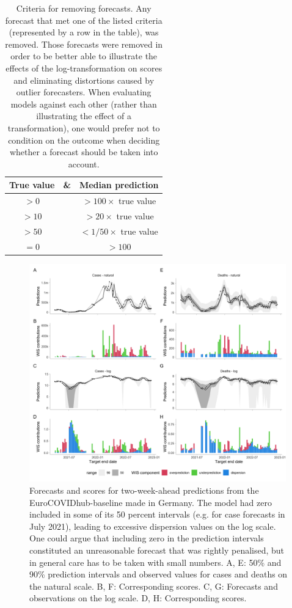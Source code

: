 \documentclass{article}
\begin{document}
\begin{table}
\centering
\begin{tabular}{ccc}
\toprule
True value & \& & Median prediction\\
\midrule
$>0$ & \ & $>100\times$ true value\\
$>10$ & \  & $>20\times$ true value\\
$>50$ & \  & $<1/50\times$ true value\\
$= 0$ & \  & $>100$\\
\bottomrule
\end{tabular}
\caption{Criteria for removing forecasts. Any forecast that met one of the listed criteria (represented by a row in the table), was removed. Those forecasts were removed in order to be better able to illustrate the effects of the log-transformation on scores and eliminating distortions caused by outlier forecasters. When evaluating models against each other (rather than illustrating the effect of a transformation), one would prefer not to condition on the outcome when deciding whether a forecast should be taken into account. }
\label{tab:erroneous}
\end{table}


\begin{figure}[h!]
    \centering
    \includegraphics[width=0.99\textwidth]{output/figures/HUB-model-comparison-baseline.png}
    \caption{
    Forecasts and scores for two-week-ahead predictions from the EuroCOVIDhub-baseline made in Germany. The model had zero included in some of its 50 percent intervals (e.g. for case forecasts in July 2021), leading to excessive dispersion values on the log scale. One could argue that including zero in the prediction intervals constituted an unreasonable forecast that was rightly penalised, but in general care has to be taken with small numbers. A, E: 50\% and 90\% prediction intervals and observed values for cases and deaths on the natural scale. B, F: Corresponding scores. C, G: Forecasts and observations on the log scale. D, H: Corresponding scores. 
    }
    \label{fig:HUB-model-comparison-baseline}
\end{figure}
\end{document}
